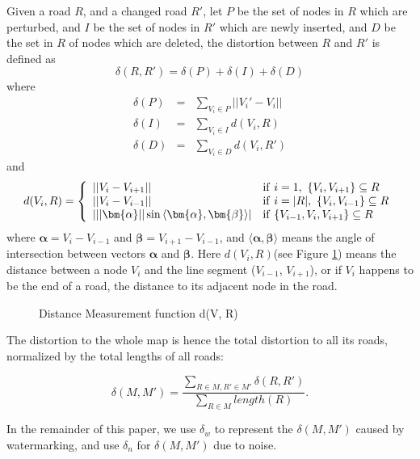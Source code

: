 Given a road $R$, and a changed road $R'$,
let $P$ be the set of nodes in $R$ which are perturbed, and $I$ be the set of
nodes in $R'$ which are newly inserted, and $D$ be the set in $R$ of nodes 
which are deleted, the distortion between $R$ and $R'$ is defined as 
\[\delta(R, R') = \delta(P) + \delta (I) + \delta (D)\]
where
\begin{eqnarray*}
\delta(P) &=& \sum_{V_i \in P} ||V_i' - V_i|| \\ 
\delta(I) &=& \sum_{V_i \in I} d(V_i, R) \\
\delta(D) &=& \sum_{V_i \in D} d(V_i, R')
\end{eqnarray*}
and 
\[
d(V_i, R) = \left\{
\begin{array}{ll}
||V_i - V_{i+1}|| & {\rm if}~ i = 1,~  \{V_i, V_{i+1}\} \subseteq R\\
||V_i - V_{i-1}|| & {\rm if}~ i = |R|,~  \{V_i, V_{i-1}\} \subseteq R\\
|||\bm{\alpha} ||\sin{\langle\bm{\alpha},\bm{\beta}\rangle}| &{\rm if}~ 
				\{V_{i-1}, V_i, V_{i+1}\} \subseteq R
\end{array}
\right. 
\]
where $\bm{\alpha}=V_i - V_{i-1}$ and $\bm{\beta}=V_{i+1}-V_{i-1}$, 
and $\langle\bm{\alpha},\bm{\beta}\rangle$ means the 
angle of intersection between vectors $\bm{\alpha}$ and $\bm{\beta}$. 
Here $d(V_i, R)$(see Figure \ref{fig:dist}) means the distance between a node $V_i$ and the line
segment ($V_{i-1}$, $V_{i+1}$), or if $V_i$ happens to be the end of a road,
the distance to its adjacent node in the road. 

\begin{figure}[h]
\centering
{}
\caption{Distance Measurement function d(V, R)}
\label{fig:dist}
\end{figure}

The distortion to the whole map is hence the total distortion to all its roads,
normalized by the total lengths of all roads:

\[
\label{equ:distort}
\delta(M, M') = \frac{\sum_{R \in M, R' \in M'} \delta(R, R')}{\sum_{R \in M}length(R)}.\] 

In the remainder of this paper, we use $\delta_w$ to represent the $\delta(M, M')$ 
caused by watermarking, and use $\delta_n$ for $\delta(M, M')$ due to noise.


